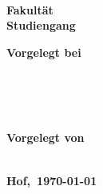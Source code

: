 \begin{titlepage} %
	
	\center %
	
	
	\textbf{\Large \mytitle}\\[0.5cm]

  \vspace{3cm}

  \textbf{\Large \textls{\mydoctype}}\\[0.8cm]
	
  \textbf{\myuniname{}\\
  Fakultät \myfaculty{}\\
  Studiengang \mycourse{}}\\[0.5cm]
	
  \vfill\vfill\vfill

	\begin{minipage}{0.4\textwidth}
		\begin{flushleft}
			\textbf{Vorgelegt bei\\
      \mydocent{}\\
      \myunistreet{} \myuninumber{}\\
      \myunizip{} \myuniplace{}
      }
		\end{flushleft}
	\end{minipage}
	~
	\begin{minipage}{0.4\textwidth}
		\begin{flushright}
			\textbf{
      Vorgelegt von\\
      \myname{}\\
      }
		\end{flushright}
	\end{minipage}
	
  \vfill

	
	\textbf{Hof,~\today} %
	
	
\end{titlepage}
\restoregeometry
